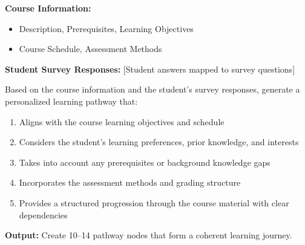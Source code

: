 \documentclass{stylefiles/capstone}
\begin{document}
\begin{tcolorbox}[breakable, colframe=customcolor, colback=customcolor!30!white, coltitle=black, title=Pathway Generation Prompt, fontupper=\small]
\textbf{Course Information:}
\begin{itemize}
    \item Description, Prerequisites, Learning Objectives
    \item Course Schedule, Assessment Methods
\end{itemize}

\vspace{0.5em}
\textbf{Student Survey Responses:} [Student answers mapped to survey questions]

\vspace{0.5em}
Based on the course information and the student's survey responses, generate a personalized learning pathway that:

\begin{enumerate}
    \item Aligns with the course learning objectives and schedule
    \item Considers the student's learning preferences, prior knowledge, and interests
    \item Takes into account any prerequisites or background knowledge gaps
    \item Incorporates the assessment methods and grading structure
    \item Provides a structured progression through the course material with clear dependencies
\end{enumerate}

\vspace{0.5em}
\textbf{Output:} Create 10--14 pathway nodes that form a coherent learning journey.

\end{tcolorbox}



\end{document}
